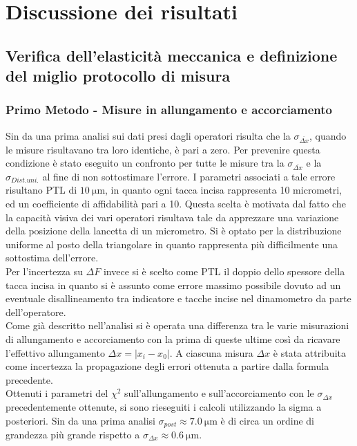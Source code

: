 \documentclass[a4paper,11pt,oneside]{article}
\begin{document}
\section{Discussione dei risultati}
\subsection{Verifica dell'elasticità meccanica e definizione del miglio protocollo di misura}\label{sec:discussione_prima_parte}
\subsubsection*{Primo Metodo - Misure in allungamento e accorciamento}
Sin da una prima analisi sui dati presi dagli operatori risulta che la $\sigma_{\overline{\Delta x}}$, quando le misure risultavano tra loro identiche, è pari a zero. Per prevenire questa condizione è stato eseguito un confronto per tutte le misure tra la $\sigma_{\overline{\Delta x}}$ e la $\sigma_{Dist. uni.}$ al fine di non sottostimare l'errore. I parametri associati a tale errore risultano PTL di $\SI{10}{\micro\metre}$, in quanto ogni tacca incisa rappresenta 10 micrometri, ed un coefficiente di affidabilità pari a 10. Questa scelta è motivata dal fatto che la capacità visiva dei vari operatori risultava tale da apprezzare una variazione della posizione della lancetta di un micrometro. Si è optato per la distribuzione uniforme al posto della triangolare in quanto rappresenta più difficilmente una sottostima dell'errore.\\
Per l'incertezza su $\Delta F$ invece si è scelto come PTL il doppio dello spessore della tacca incisa in quanto si è assunto come errore massimo possibile dovuto ad un eventuale disallineamento tra indicatore e tacche incise nel dinamometro da parte dell'operatore.\\

Come già descritto nell'analisi si è operata una differenza tra le varie misurazioni di allungamento e accorciamento con la prima di queste ultime così da ricavare l'effettivo allungamento $\Delta x=| x_{i}-x_{0}|$. A ciascuna misura $\Delta x$ è stata attribuita come incertezza la propagazione degli errori ottenuta a partire dalla formula precedente.\\

Ottenuti i parametri del ${\chi}^2$ sull'allungamento e sull'accorciamento con le $\sigma_{\Delta x}$ precedentemente ottenute, si sono rieseguiti i calcoli utilizzando la sigma a posteriori. Sin da una prima analisi $\sigma_{post} \approx \SI{7.0}{\micro\meter}$ è di circa un ordine di grandezza più grande rispetto a $\sigma_{\Delta x} \approx \SI{0.6}{\micro\metre}$.
\end{document}
